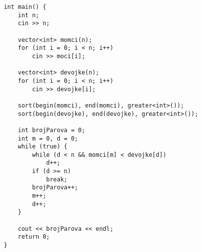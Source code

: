\documentclass{article}
\begin{document}
\begin{lstlisting}
    int main() {
        int n;
        cin >> n;
        
        vector<int> momci(n);
        for (int i = 0; i < n; i++)
            cin >> moci[i];
            
        vector<int> devojke(n);
        for (int i = 0; i < n; i++)
            cin >> devojke[i];
            
        sort(begin(momci), end(momci), greater<int>());
        sort(begin(devojke), end(devojke), greater<int>());
        
        int brojParova = 0;
        int m = 0, d = 0;
        while (true) {
            while (d < n && momci[m] < devojke[d])
                d++;
            if (d >= n) 
                break;
            brojParova++;
            m++;
            d++;
        }
        
        cout << brojParova << endl;
        return 0;
    }
\end{lstlisting}
\end{document}
